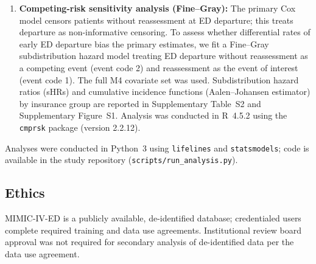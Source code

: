 \begin{enumerate}
  \item \textbf{Competing-risk sensitivity analysis (Fine--Gray):} The primary Cox model censors patients without reassessment at ED departure; this treats departure as non-informative censoring. To assess whether differential rates of early ED departure bias the primary estimates, we fit a Fine--Gray subdistribution hazard model treating ED departure without reassessment as a competing event (event code 2) and reassessment as the event of interest (event code 1). The full M4 covariate set was used. Subdistribution hazard ratios (sHRs) and cumulative incidence functions (Aalen--Johansen estimator) by insurance group are reported in Supplementary Table~S2 and Supplementary Figure~S1. Analysis was conducted in R~4.5.2 using the \texttt{cmprsk} package (version 2.2.12).
\end{enumerate}

Analyses were conducted in Python~3 using \texttt{lifelines} and \texttt{statsmodels}; code is available in the study repository (\texttt{scripts/run\_analysis.py}).

\subsection{Ethics}

MIMIC-IV-ED is a publicly available, de-identified database; credentialed users complete required training and data use agreements.
Institutional review board approval was not required for secondary analysis of de-identified data per the data use agreement.

